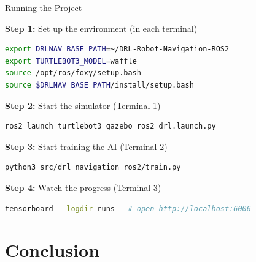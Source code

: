 \documentclass[aspectratio=169, 11pt]{beamer}
\begin{document}
\begin{frame}[fragile]{Running the Project}

  \textbf{Step 1:} Set up the environment (in each terminal)
  \begin{lstlisting}[language=bash]
export DRLNAV_BASE_PATH=~/DRL-Robot-Navigation-ROS2
export TURTLEBOT3_MODEL=waffle
source /opt/ros/foxy/setup.bash
source $DRLNAV_BASE_PATH/install/setup.bash
  \end{lstlisting}

  \textbf{Step 2:} Start the simulator (Terminal 1)
  \begin{lstlisting}[language=bash]
ros2 launch turtlebot3_gazebo ros2_drl.launch.py
  \end{lstlisting}

  \textbf{Step 3:} Start training the AI (Terminal 2)
  \begin{lstlisting}[language=bash]
python3 src/drl_navigation_ros2/train.py
  \end{lstlisting}

  \textbf{Step 4:} Watch the progress (Terminal 3)
  \begin{lstlisting}[language=bash]
tensorboard --logdir runs   # open http://localhost:6006
  \end{lstlisting}
\end{frame}

\section{Conclusion}
\end{document}
